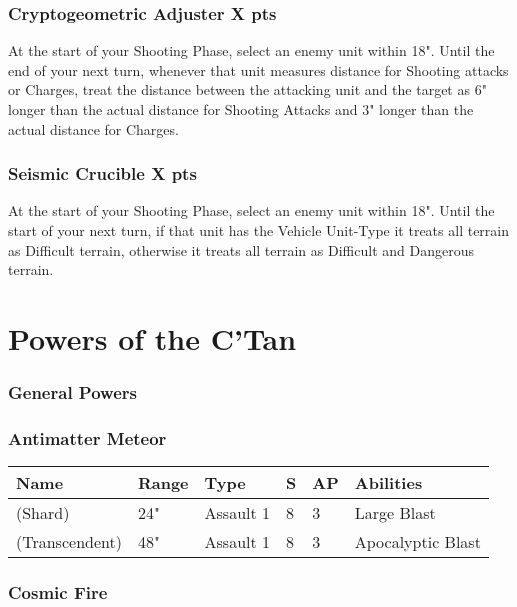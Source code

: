\subsubsection[Cryptogeometric Adjuster ]{Cryptogeometric Adjuster  \hrulefill X pts}

At the start of your Shooting Phase, select an enemy unit within 18". Until the end of your next turn, whenever that unit measures distance for Shooting attacks or Charges, treat the distance between the attacking unit and the target as 6" longer than the actual distance for Shooting Attacks and 3" longer than the actual distance for Charges.


\subsubsection[Seismic Crucible]{Seismic Crucible \hrulefill X pts}

At the start of your Shooting Phase, select an enemy unit within 18". Until the start of your next turn, if that unit has the Vehicle Unit-Type it treats all terrain as Difficult terrain, otherwise it treats all terrain as Difficult and Dangerous terrain.


\section{Powers of the C'Tan} \label{Powers of the C'Tan}

\subsubsection{General Powers}

\subsubsection{Antimatter Meteor} \label{Antimatter Meteor}

\noindent
\begin{tabular}{||m{160pt} m{31pt} m{55pt} m{12pt} m{12pt} m{200pt}||}
	\hline
	Name & Range & Type & S & AP & Abilities \\
	\hline
	\quickref{Antimatter Meteor} (Shard) & 24" & Assault 1 & 8 & 3 & Large Blast \\
	\quickref{Antimatter Meteor} (Transcendent) & 48" & Assault 1 & 8 & 3 & Apocalyptic Blast \\
	\hline
\end{tabular}

\subsubsection{Cosmic Fire} \label{Cosmic Fire}

